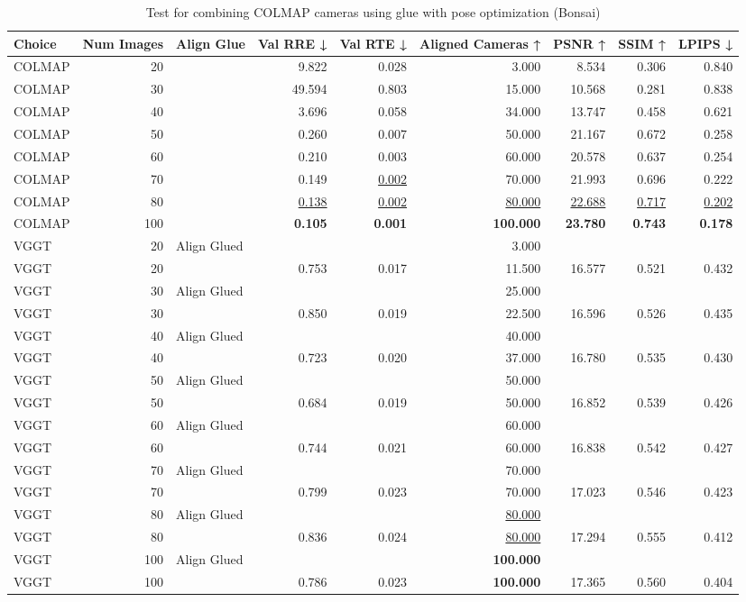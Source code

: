 \begin{table}[H]
\caption{Test for combining COLMAP cameras using glue with pose optimization (Bonsai)}
\label{tab:99_align_glue_pose_opt_bonsai}
\begin{tabular}{lrlrrrrrr}
\toprule
Choice & Num Images & Align Glue & Val RRE ↓ & Val RTE ↓ & Aligned Cameras ↑ & PSNR ↑ & SSIM ↑ & LPIPS ↓ \\
\midrule
COLMAP & 20 &  & 9.822 & 0.028 & 3.000 & 8.534 & 0.306 & 0.840 \\
COLMAP & 30 &  & 49.594 & 0.803 & 15.000 & 10.568 & 0.281 & 0.838 \\
COLMAP & 40 &  & 3.696 & 0.058 & 34.000 & 13.747 & 0.458 & 0.621 \\
COLMAP & 50 &  & 0.260 & 0.007 & 50.000 & 21.167 & 0.672 & 0.258 \\
COLMAP & 60 &  & 0.210 & 0.003 & 60.000 & 20.578 & 0.637 & 0.254 \\
COLMAP & 70 &  & 0.149 & \underline{0.002} & 70.000 & 21.993 & 0.696 & 0.222 \\
COLMAP & 80 &  & \underline{0.138} & \underline{0.002} & \underline{80.000} & \underline{22.688} & \underline{0.717} & \underline{0.202} \\
COLMAP & 100 &  & \textbf{0.105} & \textbf{0.001} & \textbf{100.000} & \textbf{23.780} & \textbf{0.743} & \textbf{0.178} \\
VGGT & 20 & Align Glued &  &  & 3.000 &  &  &  \\
VGGT & 20 &  & 0.753 & 0.017 & 11.500 & 16.577 & 0.521 & 0.432 \\
VGGT & 30 & Align Glued &  &  & 25.000 &  &  &  \\
VGGT & 30 &  & 0.850 & 0.019 & 22.500 & 16.596 & 0.526 & 0.435 \\
VGGT & 40 & Align Glued &  &  & 40.000 &  &  &  \\
VGGT & 40 &  & 0.723 & 0.020 & 37.000 & 16.780 & 0.535 & 0.430 \\
VGGT & 50 & Align Glued &  &  & 50.000 &  &  &  \\
VGGT & 50 &  & 0.684 & 0.019 & 50.000 & 16.852 & 0.539 & 0.426 \\
VGGT & 60 & Align Glued &  &  & 60.000 &  &  &  \\
VGGT & 60 &  & 0.744 & 0.021 & 60.000 & 16.838 & 0.542 & 0.427 \\
VGGT & 70 & Align Glued &  &  & 70.000 &  &  &  \\
VGGT & 70 &  & 0.799 & 0.023 & 70.000 & 17.023 & 0.546 & 0.423 \\
VGGT & 80 & Align Glued &  &  & \underline{80.000} &  &  &  \\
VGGT & 80 &  & 0.836 & 0.024 & \underline{80.000} & 17.294 & 0.555 & 0.412 \\
VGGT & 100 & Align Glued &  &  & \textbf{100.000} &  &  &  \\
VGGT & 100 &  & 0.786 & 0.023 & \textbf{100.000} & 17.365 & 0.560 & 0.404 \\
\bottomrule
\end{tabular}
\end{table}
